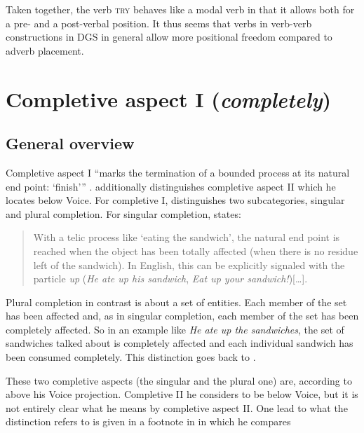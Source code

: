 \noindent Taken together, the verb \textsc{try} behaves like a modal verb in that it allows both for a pre- and a post-verbal position. It thus seems that verbs in verb-verb constructions in DGS in general allow more positional freedom compared to adverb placement.


\section{Completive aspect I (\textit{completely})}\label{completiveone}
\subsection{General overview}
Completive aspect I ``marks the termination of a bounded process at its natural end point: `finish''' \citep[70]{cinque2006restructuring}. \citet[100--104]{cinque1999adverbs} additionally distinguishes completive aspect II which he locates below Voice. For completive I, \citet{cinque1999adverbs} distinguishes two subcategories, singular and plural completion. For singular completion, \citet[100]{cinque1999adverbs} states:

\begin{quote}
With a telic process like `eating the sandwich', the natural end point is reached when the object has been totally affected (when there is no residue left of the sandwich). In English, this can be explicitly signaled with the particle \textit{up} (\textit{He ate up his sandwich}, \textit{Eat up your sandwich!})[\dots ].
\end{quote}

\noindent Plural completion in contrast is about a set of entities. Each member of the set has been affected and, as in singular completion, each member of the set has been completely affected. So in an example like \textit{He ate up the sandwiches}, the set of sandwiches talked about is completely affected and each individual sandwich has been consumed completely. This distinction goes back to \citet[57--69]{bybee1994evolution}. 

These two completive aspects (the singular and the plural one) are, according to \citet{cinque1999adverbs} above his Voice projection. Completive II he considers to be below Voice, but it is not entirely clear what he means by completive aspect II. One lead to what the distinction refers to is given in a footnote in \citet[178]{cinque1999adverbs} in which he compares

